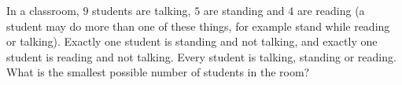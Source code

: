 In a classroom, $9$ students are talking, $5$ are standing and $4$ are reading (a student may do more than one of these things, for example stand while reading or talking). Exactly one student is standing and not talking, and exactly one student is reading and not talking. Every student is talking, standing or reading. What is the smallest possible number of students in the room?
